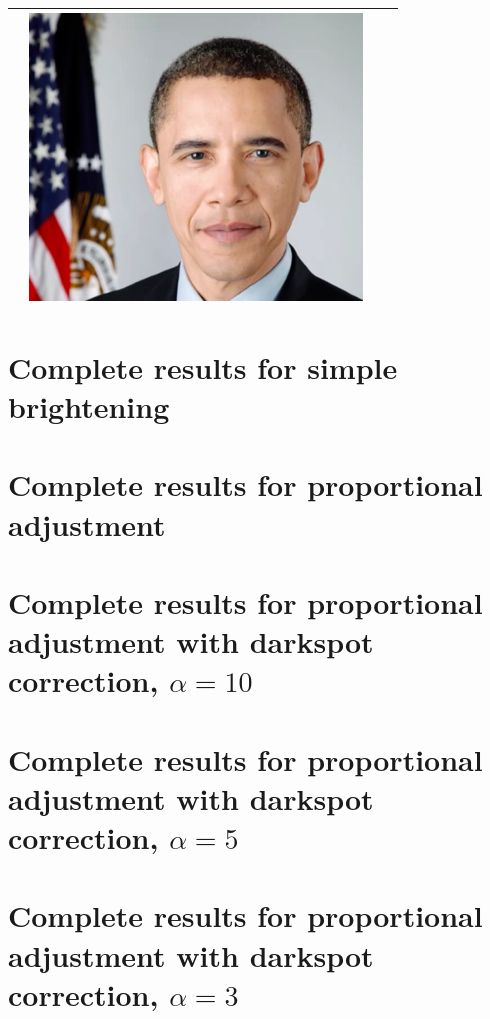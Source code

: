\documentclass[12pt, a4paper]{article}
\begin{document}
\begin{longtable}{|c||c|c|c|}
\begin{minipage}{.29\textwidth}
  \end{minipage} & 
  \begin{minipage}{.29\textwidth}
    \includegraphics[width=\textwidth,height=\textheight,keepaspectratio]{images/obama_res}
  \end{minipage} \\
    \hline
\end{longtable}
\pagebreak

\section{Complete results for simple brightening}\label{app:boost}

\pagebreak

\section{Complete results for proportional adjustment}\label{app:prop}

\pagebreak

\section{Complete results for proportional adjustment with darkspot correction, $\alpha = 10$}\label{app:prop_corr_a10}

\pagebreak

\section{Complete results for proportional adjustment with darkspot correction, $\alpha = 5$}\label{app:prop_corr_a5}

\pagebreak

\section{Complete results for proportional adjustment with darkspot correction, $\alpha = 3$}\label{app:prop_corr_a3}

\end{document}
